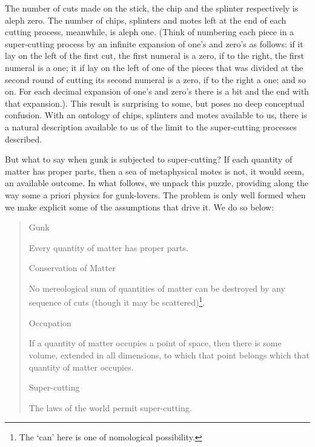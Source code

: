 \documentclass[
  11pt,
  letterpaper,
  DIV=11,
  numbers=noendperiod,
  twoside]{scrartcl}
\providecommand{\tightlist}{%
  \setlength{\itemsep}{0pt}\setlength{\parskip}{0pt}}
\begin{document}
The number of cuts made on the stick, the chip and the splinter
respectively is aleph zero. The number of chips, splinters and motes
left at the end of each cutting process, meanwhile, is aleph one. (Think
of numbering each piece in a super-cutting process by an infinite
expansion of one's and zero's as follows: if it lay on the left of the
first cut, the first numeral is a zero, if to the right, the first
numeral is a one; it if lay on the left of one of the pieces that was
divided at the second round of cutting its second numeral is a zero, if
to the right a one; and so on. For each decimal expansion of one's and
zero's there is a bit and the end with that expansion.). This result is
surprising to some, but poses no deep conceptual confusion. With an
ontology of chips, splinters and motes available to us, there is a
natural description available to us of the limit to the super-cutting
processes described.

But what to say when gunk is subjected to super-cutting? If each
quantity of matter has proper parts, then a sea of metaphysical motes is
not, it would seem, an available outcome. In what follows, we unpack
this puzzle, providing along the way some a priori physics for
gunk-lovers. The problem is only well formed when we make explicit some
of the assumptions that drive it. We do so below:

\begin{quote}
\begin{description}
\tightlist
\item[(1)]
Gunk

Every quantity of matter has proper parts.
\item[(2)]
Conservation of Matter

No mereological sum of quantities of matter can be destroyed by any
sequence of cuts (though it may be scattered)\footnote{The `can' here is
  one of nomological possibility.}.
\item[(3)]
Occupation

If a quantity of matter occupies a point of space, then there is some
volume, extended in all dimensions, to which that point belongs which
that quantity of matter occupies.
\item[(4)]
Super-cutting

The laws of the world permit super-cutting.
\end{description}
\end{quote}
\end{document}
